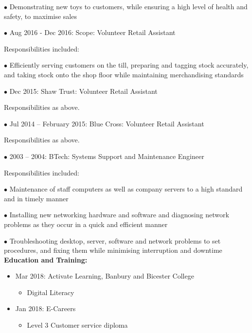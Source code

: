 \documentclass[10pt,a4paper]{book}
\begin{document}
\begin{flushleft}
  \item[$\bullet$]Demonstrating new toys to customers, while ensuring a high level of health and safety, to maximise sales
\linebreak{}
  \item[$\bullet$]Aug 2016 - Dec 2016: Scope: Volunteer Retail Assistant

Responsibilities included:

  \item[$\bullet$]Efficiently serving customers on the till, preparing and tagging stock accurately, and taking stock onto the shop floor while maintaining merchandising standards
\linebreak{}
  \item[$\bullet$]Dec 2015: Shaw Trust: Volunteer Retail Assistant

Responsibilities as above.
\linebreak{}
  \item[$\bullet$]Jul 2014 -- February 2015: Blue Cross: Volunteer Retail Assistant

Responsibilities as above.
\linebreak{}
\item[$\bullet$]2003 -- 2004: BTech: Systems Support and Maintenance Engineer
  
Responsibilities included:

  \item[$\bullet$]Maintenance of staff computers as well as company servers to a high standard and in timely manner

  \item[$\bullet$]Installing new networking hardware and software and diagnosing network problems as they occur in a quick and efficient manner

  \item[$\bullet$]Troubleshooting desktop, server, software and network problems to set procedures, and fixing them while minimising interruption and downtime
\linebreak{}
\textbf {Education and Training:}
\begin{itemize}
  \item Mar 2018: Activate Learning, Banbury and Bicester College
    \begin{itemize}
    \item Digital Literacy
  \end{itemize}
\end{itemize}
\begin{itemize}
  \item Jan 2018: E-Careers
    \begin{itemize}
    \item Level 3 Customer service diploma


\end{itemize}
\end{itemize}
\end{flushleft}
\end{document}
